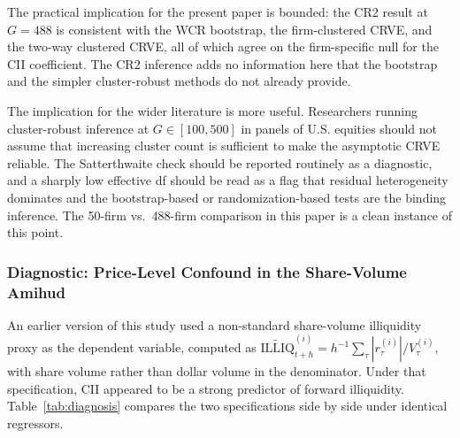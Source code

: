 \documentclass[preprint,12pt,authoryear]{elsarticle}
\begin{document}
The practical implication for the present paper is bounded: the CR2 result at $G = 488$ is consistent with the WCR bootstrap, the firm-clustered CRVE, and the two-way clustered CRVE, all of which agree on the firm-specific null for the CII coefficient. The CR2 inference adds no information here that the bootstrap and the simpler cluster-robust methods do not already provide.

The implication for the wider literature is more useful. Researchers running cluster-robust inference at $G \in [100, 500]$ in panels of U.S. equities should not assume that increasing cluster count is sufficient to make the asymptotic CRVE reliable. The Satterthwaite check should be reported routinely as a diagnostic, and a sharply low effective df should be read as a flag that residual heterogeneity dominates and the bootstrap-based or randomization-based tests are the binding inference. The 50-firm vs.\ 488-firm comparison in this paper is a clean instance of this point.

\subsubsection{Diagnostic: Price-Level Confound in the Share-Volume Amihud}
\label{sec:h4_diagnosis}

An earlier version of this study used a non-standard share-volume illiquidity proxy as the dependent variable, computed as $\widetilde{\mathrm{ILLIQ}}^{(i)}_{t+h} = h^{-1} \sum_{\tau} |r^{(i)}_\tau| / V^{(i)}_\tau$, with share volume rather than dollar volume in the denominator. Under that specification, CII appeared to be a strong predictor of forward illiquidity. Table~\ref{tab:diagnosis} compares the two specifications side by side under identical regressors.
\end{document}
